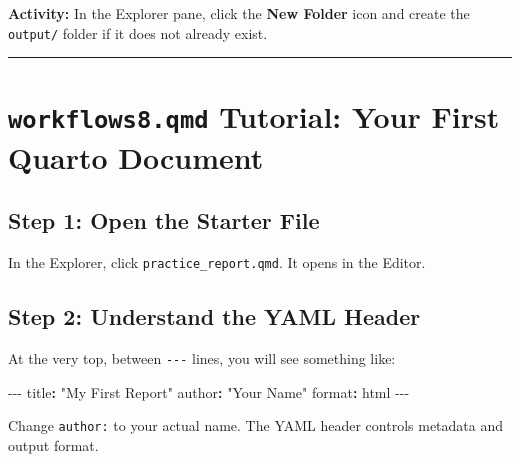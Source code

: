 \documentclass[
  letterpaper,
  DIV=11,
  numbers=noendperiod,
  oneside]{scrreprt}
\newenvironment{Shaded}{\begin{snugshade}}{\end{snugshade}}
\newcommand{\AttributeTok}[1]{\textcolor[rgb]{0.40,0.45,0.13}{#1}}
\newcommand{\FunctionTok}[1]{\textcolor[rgb]{0.28,0.35,0.67}{#1}}
\newcommand{\KeywordTok}[1]{\textcolor[rgb]{0.00,0.23,0.31}{\textbf{#1}}}
\newcommand{\PreprocessorTok}[1]{\textcolor[rgb]{0.68,0.00,0.00}{#1}}
\newcommand{\StringTok}[1]{\textcolor[rgb]{0.13,0.47,0.30}{#1}}
\begin{document}
\textbf{Activity:} In the Explorer pane, click the \textbf{New Folder}
icon and create the \texttt{output/} folder if it does not already
exist.

\begin{center}\rule{0.5\linewidth}{0.5pt}\end{center}

\section*{\texorpdfstring{\texttt{workflows8.qmd} Tutorial: Your First
Quarto
Document}{workflows8.qmd Tutorial: Your First Quarto Document}}\label{workflows8.qmd-tutorial-your-first-quarto-document}


\subsection*{Step 1: Open the Starter
File}\label{step-1-open-the-starter-file}

In the Explorer, click \texttt{practice\_report.qmd}. It opens in the
Editor.

\subsection*{Step 2: Understand the YAML
Header}\label{step-2-understand-the-yaml-header}

At the very top, between \texttt{-\/-\/-} lines, you will see something
like:

\begin{Shaded}
\begin{Highlighting}[numbers=left,,]
\PreprocessorTok{{-}{-}{-}}
\FunctionTok{title}\KeywordTok{:}\AttributeTok{ }\StringTok{"My First Report"}
\FunctionTok{author}\KeywordTok{:}\AttributeTok{ }\StringTok{"Your Name"}
\FunctionTok{format}\KeywordTok{:}\AttributeTok{ html}
\PreprocessorTok{{-}{-}{-}}
\end{Highlighting}
\end{Shaded}

Change \texttt{author:} to your actual name. The YAML header controls
metadata and output format.
\end{document}
